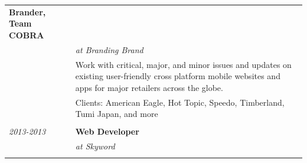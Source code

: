 \documentclass[]{article}
\begin{document}
\begin{multicols}{2}
\begin{longtable}[c]{@{}ll@{}}
\begin{minipage}[t]{0.74\columnwidth}\raggedright\strut
\textbf{Brander, Team COBRA}
\strut\end{minipage}\tabularnewline
\begin{minipage}[t]{0.20\columnwidth}\raggedright\strut
\strut\end{minipage} &
\begin{minipage}[t]{0.74\columnwidth}\raggedright\strut
\emph{at Branding Brand}
\strut\end{minipage}\tabularnewline
\begin{minipage}[t]{0.20\columnwidth}\raggedright\strut
\strut\end{minipage} &
\begin{minipage}[t]{0.74\columnwidth}\raggedright\strut
\color{grey} Work with critical, major, and minor issues and updates on
existing user-friendly cross platform mobile websites and apps for major
retailers across the globe.
\strut\end{minipage}\tabularnewline
\begin{minipage}[t]{0.20\columnwidth}\raggedright\strut
\strut\end{minipage} &
\begin{minipage}[t]{0.74\columnwidth}\raggedright\strut
Clients: American Eagle, Hot Topic, Speedo, Timberland, Tumi Japan, and
more
\strut\end{minipage}\tabularnewline
\begin{minipage}[t]{0.20\columnwidth}\raggedright\strut
\strut\end{minipage} &
\begin{minipage}[t]{0.74\columnwidth}\raggedright\strut
\strut\end{minipage}\tabularnewline
\begin{minipage}[t]{0.20\columnwidth}\raggedright\strut
\color{grey} \emph{2013-2013}
\strut\end{minipage} &
\begin{minipage}[t]{0.74\columnwidth}\raggedright\strut
\textbf{Web Developer}
\strut\end{minipage}\tabularnewline
\begin{minipage}[t]{0.20\columnwidth}\raggedright\strut
\strut\end{minipage} &
\begin{minipage}[t]{0.74\columnwidth}\raggedright\strut
\emph{at Skyword}
\strut\end{minipage}\tabularnewline
\begin{minipage}[t]{0.20\columnwidth}\raggedright\strut

\end{minipage}
\end{longtable}
\end{multicols}
\end{document}
